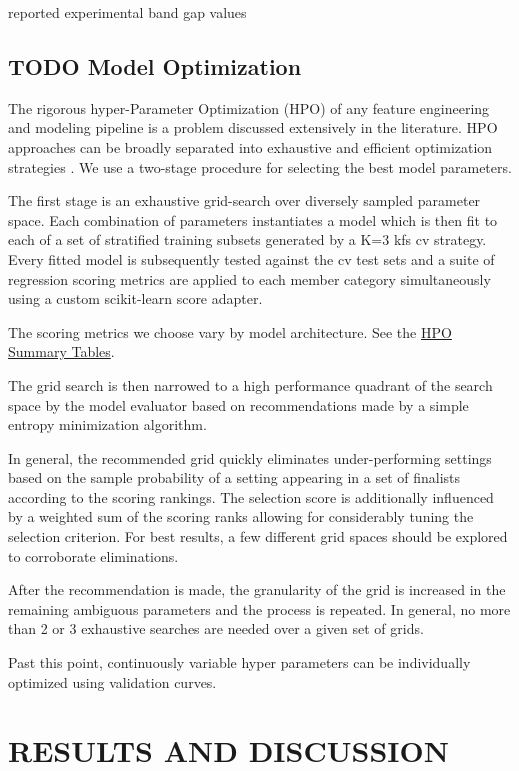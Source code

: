 \documentclass[aip, jmp, amsmath, amssymb]{revtex4-2}
\begin{document}
reported experimental band gap values\cite{kim-2014-cdses-nanow,swanson-2017-co-sublim}

\subsection*{{\bfseries\sffamily TODO} Model Optimization}
\label{sec:org5d0bb03}
The rigorous hyper-Parameter Optimization (HPO) of any feature
engineering and modeling pipeline is a problem discussed extensively
in the literature. HPO approaches can be broadly separated into
exhaustive and efficient optimization strategies
\cite{yang-2020-hyper-optim}. We use a two-stage procedure for
selecting the best model parameters.

The first stage is an exhaustive grid-search over diversely sampled
parameter space. Each combination of parameters instantiates a model
which is then fit to each of a set of stratified training subsets
generated by a K=3 \gls{kfs} \gls{cv} strategy. Every
fitted model is subsequently tested against the \gls{cv} test
sets and a suite of regression scoring metrics are applied to each
member category simultaneously using a custom scikit-learn score
adapter.

The scoring metrics we choose vary by model architecture. See the \hyperref[sec:org22f6d9a]{HPO Summary Tables}.

The grid search is then narrowed to a high performance quadrant of the
search space by the model evaluator based on recommendations made by a
simple entropy minimization algorithm.

In general, the recommended grid quickly eliminates under-performing
settings based on the sample probability of a setting appearing in a
set of finalists according to the scoring rankings. The selection
score is additionally influenced by a weighted sum of the scoring
ranks allowing for considerably tuning the selection criterion.  For
best results, a few different grid spaces should be explored to
corroborate eliminations.

After the recommendation is made, the granularity of the grid is
increased in the remaining ambiguous parameters and the process is
repeated. In general, no more than 2 or 3 exhaustive searches are
needed over a given set of grids.

Past this point, continuously variable hyper parameters can be
individually optimized using validation curves.

\section*{RESULTS AND DISCUSSION}
\label{sec:orgaa3d2ca}
\end{document}
